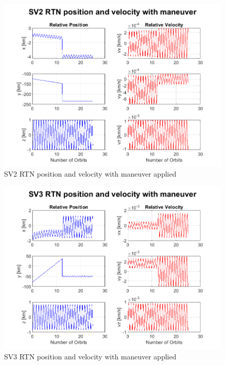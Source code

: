 \begin{figure}[H]
    \centering
    \includegraphics[width=0.7\linewidth]{sim/figures/SV2_rel_pos_vel_eom_maneuver.png}
    \caption{SV2 RTN position and velocity with maneuver applied}
    \label{fig:SV2_rel_pos_vel_eom_maneuver}
\end{figure}

\begin{figure}[H]
    \centering
    \includegraphics[width=0.7\linewidth]{sim/figures/SV3_rel_pos_vel_eom_maneuver.png}
    \caption{SV3 RTN position and velocity with maneuver applied}
    \label{fig:SV3_rel_pos_vel_eom_maneuver}
\end{figure}